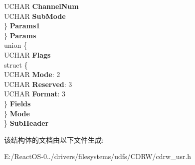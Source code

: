 \begin{DoxyCompactItemize}
\begin{tabbing}
\>\>\>UCHAR {\bfseries ChannelNum}\\
\>\>\>UCHAR {\bfseries SubMode}\\
\>\>\} {\bfseries Params1}\\
\>\} {\bfseries Params}\\
\>union \{\\
\>\>UCHAR {\bfseries Flags}\\
\>\>struct \{\\
\>\>\>UCHAR {\bfseries Mode}: 2\\
\>\>\>UCHAR {\bfseries Reserved}: 3\\
\>\>\>UCHAR {\bfseries Format}: 3\\
\>\>\} {\bfseries Fields}\\
\>\} {\bfseries Mode}\\
\} {\bfseries SubHeader}\\

\end{tabbing}\end{DoxyCompactItemize}


该结构体的文档由以下文件生成\+:\begin{DoxyCompactItemize}
\item 
E\+:/\+React\+O\+S-\/0../drivers/filesystems/udfs/\+C\+D\+R\+W/cdrw\+\_\+usr.\+h\end{DoxyCompactItemize}
